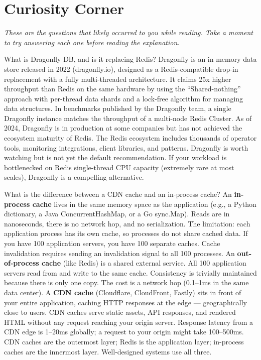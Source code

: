 \documentclass[11pt,a4paper]{article}
\begin{document}
\newpage
\section*{Curiosity Corner}

\textit{These are the questions that likely occurred to you while reading. Take a moment to try answering each one before reading the explanation.}

\vspace{8pt}

\begin{curiobox}{What is Dragonfly DB, and is it replacing Redis?}
Dragonfly is an in-memory data store released in 2022 (dragonfly.io), designed as a Redis-compatible drop-in replacement with a fully multi-threaded architecture. It claims 25x higher throughput than Redis on the same hardware by using the ``Shared-nothing'' approach with per-thread data shards and a lock-free algorithm for managing data structures. In benchmarks published by the Dragonfly team, a single Dragonfly instance matches the throughput of a multi-node Redis Cluster. As of 2024, Dragonfly is in production at some companies but has not achieved the ecosystem maturity of Redis. The Redis ecosystem includes thousands of operator tools, monitoring integrations, client libraries, and patterns. Dragonfly is worth watching but is not yet the default recommendation. If your workload is bottlenecked on Redis single-thread CPU capacity (extremely rare at most scales), Dragonfly is a compelling alternative.
\end{curiobox}

\vspace{6pt}

\begin{curiobox}{What is the difference between a CDN cache and an in-process cache?}
An \textbf{in-process cache} lives in the same memory space as the application (e.g., a Python dictionary, a Java ConcurrentHashMap, or a Go sync.Map). Reads are in nanoseconds, there is no network hop, and no serialization. The limitation: each application process has its own cache, so processes do not share cached data. If you have 100 application servers, you have 100 separate caches. Cache invalidation requires sending an invalidation signal to all 100 processes. An \textbf{out-of-process cache} (like Redis) is a shared external service. All 100 application servers read from and write to the same cache. Consistency is trivially maintained because there is only one copy. The cost is a network hop (0.1--1ms in the same data center). A \textbf{CDN cache} (Cloudflare, CloudFront, Fastly) sits in front of your entire application, caching HTTP responses at the edge --- geographically close to users. CDN caches serve static assets, API responses, and rendered HTML without any request reaching your origin server. Response latency from a CDN edge is 1--20ms globally; a request to your origin might take 100--500ms. CDN caches are the outermost layer; Redis is the application layer; in-process caches are the innermost layer. Well-designed systems use all three.
\end{curiobox}
\end{document}
